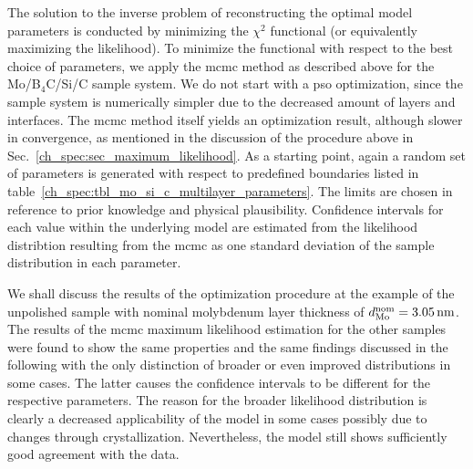 The solution to the inverse problem of reconstructing the optimal model parameters is conducted by minimizing  the $\chi^2$ functional (or equivalently maximizing the likelihood). To minimize the functional with respect to the best choice of parameters, we apply the \gls{mcmc} method as described above for the Mo/B$_4$C/Si/C sample system. We do not start with a \gls{pso} optimization, since the sample system is numerically simpler due to the decreased amount of layers and interfaces. The \gls{mcmc} method itself yields an optimization result, although slower in convergence, as mentioned in the discussion of the procedure above in Sec.~\ref{ch_spec:sec_maximum_likelihood}. As a starting point, again a random set of parameters is generated with respect to predefined boundaries listed in table~\ref{ch_spec:tbl_mo_si_c_multilayer_parameters}. The limits are chosen in reference to prior knowledge and physical plausibility. Confidence intervals for each value within the underlying model are estimated from the likelihood distribtion resulting from the \gls{mcmc} as one standard deviation of the sample distribution in each parameter.

We shall discuss the results of the optimization procedure at the example of the unpolished sample with nominal molybdenum layer thickness of $d_\text{Mo}^\text{nom} = \nm{3.05}$. The results of the \gls{mcmc} maximum likelihood estimation for the other samples were found to show the same properties and the same findings discussed in the following with the only distinction of broader or even improved distributions in some cases. The latter causes the confidence intervals to be different for the respective parameters. The reason for the broader likelihood distribution is clearly a decreased applicability of the model in some cases possibly due to changes through crystallization. Nevertheless, the model still shows sufficiently good agreement with the data.

